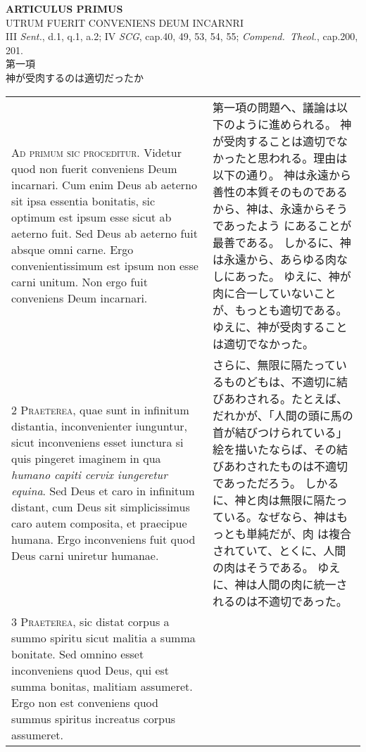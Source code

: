 \documentclass[10pt]{jsarticle} %
\begin{document}
\newpage


\begin{center}
 {\Large {\bf ARTICULUS PRIMUS}}\\
 {\large UTRUM FUERIT CONVENIENS DEUM INCARNRI}\\
 {\footnotesize III {\itshape Sent.}, d.1, q.1, a.2; IV {\itshape SCG},
 cap.40, 49, 53, 54, 55; {\itshape Compend.~Theol.}, cap.200, 201.}\\
 {\Large 第一項\\神が受肉するのは適切だったか}
\end{center}


\begin{longtable}{p{21em}p{21em}}
{\Huge A}{\scshape d primum sic proceditur}. Videtur quod non fuerit conveniens Deum
incarnari. Cum enim Deus ab aeterno sit ipsa essentia bonitatis, sic
optimum est ipsum esse sicut ab aeterno fuit. Sed Deus ab aeterno fuit
absque omni carne. Ergo convenientissimum est ipsum non esse carni
unitum. Non ergo fuit conveniens Deum incarnari.

&

第一項の問題へ、議論は以下のように進められる。
神が受肉することは適切でなかったと思われる。理由は以下の通り。
神は永遠から善性の本質そのものであるから、神は、永遠からそうであったよう
 にあることが最善である。
しかるに、神は永遠から、あらゆる肉なしにあった。
ゆえに、神が肉に合一していないことが、もっとも適切である。
ゆえに、神が受肉することは適切でなかった。

\\

2 {\scshape Praeterea}, quae sunt in infinitum distantia, inconvenienter iunguntur,
sicut inconveniens esset iunctura si quis pingeret imaginem in qua
{\itshape humano capiti cervix iungeretur equina}. Sed Deus et caro in infinitum
distant, cum Deus sit simplicissimus caro autem composita, et praecipue
humana. Ergo inconveniens fuit quod Deus carni uniretur humanae.

&

さらに、無限に隔たっているものどもは、不適切に結びあわされる。たとえば、
 だれかが、「人間の頭に馬の首が結びつけられている」絵を描いたならば、その結
 びあわされたものは不適切であっただろう。
しかるに、神と肉は無限に隔たっている。なぜなら、神はもっとも単純だが、肉
 は複合されていて、とくに、人間の肉はそうである。
ゆえに、神は人間の肉に統一されるのは不適切であった。

\\


3 {\scshape Praeterea}, sic distat corpus a summo spiritu sicut malitia a summa
bonitate. Sed omnino esset inconveniens quod Deus, qui est summa
bonitas, malitiam assumeret. Ergo non est conveniens quod summus
spiritus increatus corpus assumeret.


\end{longtable}
\end{document}

